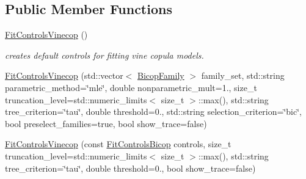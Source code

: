 \subsection*{Public Member Functions}
\begin{DoxyCompactItemize}
\item 
\hyperlink{classvinecopulib_1_1_fit_controls_vinecop_ad101d135c8d8fe66046d931947f45bef}{Fit\+Controls\+Vinecop} ()\hypertarget{classvinecopulib_1_1_fit_controls_vinecop_ad101d135c8d8fe66046d931947f45bef}{}\label{classvinecopulib_1_1_fit_controls_vinecop_ad101d135c8d8fe66046d931947f45bef}

\begin{DoxyCompactList}\small\item\em creates default controls for fitting vine copula models. \end{DoxyCompactList}\item 
\hyperlink{classvinecopulib_1_1_fit_controls_vinecop_a0e908bcfa9eb6768d19dd711a6d11ad3}{Fit\+Controls\+Vinecop} (std\+::vector$<$ \hyperlink{namespacevinecopulib_a42e95cc06d33896199caab0c11ad44f3}{Bicop\+Family} $>$ family\+\_\+set, std\+::string parametric\+\_\+method=\char`\"{}mle\char`\"{}, double nonparametric\+\_\+mult=1., size\+\_\+t truncation\+\_\+level=std\+::numeric\+\_\+limits$<$ size\+\_\+t $>$\+::max(), std\+::string tree\+\_\+criterion=\char`\"{}tau\char`\"{}, double threshold=0., std\+::string selection\+\_\+criterion=\char`\"{}bic\char`\"{}, bool preselect\+\_\+families=true, bool show\+\_\+trace=false)
\item 
\hyperlink{classvinecopulib_1_1_fit_controls_vinecop_ac755f0c41c3322cdd773a7a75ae98e7c}{Fit\+Controls\+Vinecop} (const \hyperlink{classvinecopulib_1_1_fit_controls_bicop}{Fit\+Controls\+Bicop} controls, size\+\_\+t truncation\+\_\+level=std\+::numeric\+\_\+limits$<$ size\+\_\+t $>$\+::max(), std\+::string tree\+\_\+criterion=\char`\"{}tau\char`\"{}, double threshold=0., bool show\+\_\+trace=false)
\end{DoxyCompactItemize}
{\bf }\par
